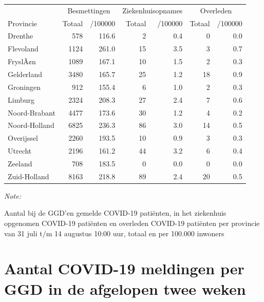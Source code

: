 \documentclass[
  english,
  man,floatsintext]{apa6}
\begin{document}
\begin{table}
\centering
\begin{threeparttable}
\begin{tabular}{lrrrrrr}
\toprule
\multicolumn{1}{c}{ } & \multicolumn{2}{c}{Besmettingen} & \multicolumn{2}{c}{Ziekenhuisopnames} & \multicolumn{2}{c}{Overleden} \\
\cmidrule(l{3pt}r{3pt}){2-3} \cmidrule(l{3pt}r{3pt}){4-5} \cmidrule(l{3pt}r{3pt}){6-7}
Provincie & Totaal & /100000 & Totaal & /100000 & Totaal & /100000\\
\midrule
Drenthe & 578 & 116.6 & 2 & 0.4 & 0 & 0.0\\
Flevoland & 1124 & 261.0 & 15 & 3.5 & 3 & 0.7\\
FryslÃ¢n & 1089 & 167.1 & 10 & 1.5 & 2 & 0.3\\
Gelderland & 3480 & 165.7 & 25 & 1.2 & 18 & 0.9\\
Groningen & 912 & 155.4 & 6 & 1.0 & 2 & 0.3\\
Limburg & 2324 & 208.3 & 27 & 2.4 & 7 & 0.6\\
Noord-Brabant & 4477 & 173.6 & 30 & 1.2 & 4 & 0.2\\
Noord-Holland & 6825 & 236.3 & 86 & 3.0 & 14 & 0.5\\
Overijssel & 2260 & 193.5 & 10 & 0.9 & 3 & 0.3\\
Utrecht & 2196 & 161.2 & 44 & 3.2 & 6 & 0.4\\
Zeeland & 708 & 183.5 & 0 & 0.0 & 0 & 0.0\\
Zuid-Holland & 8163 & 218.8 & 89 & 2.4 & 20 & 0.5\\
\bottomrule
\end{tabular}
\begin{tablenotes}
\item \textit{Note: } 
\item Aantal bij de GGD’en gemelde COVID-19 patiënten, in het ziekenhuis opgenomen COVID-19 patiënten en overleden COVID-19 patiënten per provincie van 31 juli t/m 14 augustus 10:00 uur, totaal en per 100.000 inwoners
\end{tablenotes}
\end{threeparttable}
\end{table}

\newpage

\hypertarget{aantal-covid-19-meldingen-per-ggd-in-de-afgelopen-twee-weken}{%
\section{Aantal COVID-19 meldingen per GGD in de afgelopen twee weken}\label{aantal-covid-19-meldingen-per-ggd-in-de-afgelopen-twee-weken}}
\end{document}
